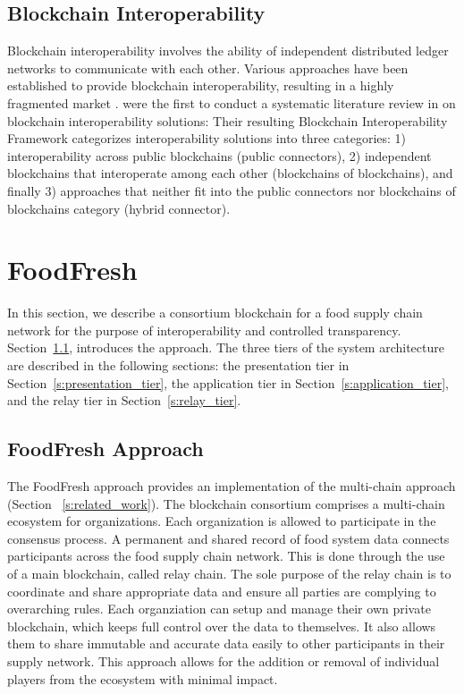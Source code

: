 \documentclass[conference]{IEEEtran}
\begin{document}
\subsection{Blockchain Interoperability} \label{s:blockchain_interoperability}
Blockchain interoperability involves the ability of independent distributed ledger networks to communicate with each other. Various approaches have been established to provide blockchain interoperability, resulting in a highly fragmented market \cite{belchior2021survey}.
\citeauthor{belchior2021survey} were the first to conduct a systematic literature review in \cite{belchior2021survey} on blockchain interoperability solutions:
Their resulting Blockchain Interoperability Framework categorizes interoperability solutions into three categories: 1) interoperability across public blockchains (public connectors),  2) independent blockchains that interoperate among each other (blockchains of blockchains), and finally 3) approaches that neither fit into the public connectors nor blockchains of blockchains category (hybrid connector). 

\section{FoodFresh} \label{s:chainFresh}
In this section, we describe a consortium blockchain for a food supply chain network for the purpose of interoperability and controlled transparency. Section~\ref{s:chainfresh_approach}, introduces the approach. The three tiers of the system architecture are described in the following sections: the presentation tier in Section~\ref{s:presentation_tier},  the application tier in Section~\ref{s:application_tier}, and the relay tier in Section~\ref{s:relay_tier}.

\subsection{FoodFresh Approach} \label{s:chainfresh_approach}
The FoodFresh approach provides an implementation of the multi-chain approach (Section~ \ref{s:related_work}). The blockchain consortium comprises a multi-chain ecosystem for organizations. Each organization is allowed to participate in the consensus process. 
A permanent and shared record of food system data connects participants across the food supply chain network. This is done through the use of a main blockchain, called relay chain. The sole purpose of the relay chain is to coordinate and share appropriate data and ensure all parties are complying to overarching rules. Each organziation can setup and manage their own private blockchain, which keeps full control over the data to themselves. It also allows them to share immutable and accurate data easily to other participants in their supply network. This approach allows for the addition or removal of individual players from the ecosystem with minimal impact.
\end{document}
